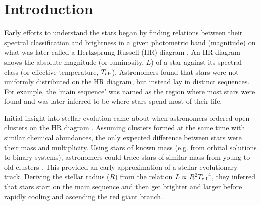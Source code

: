 %
%
%
%
%
\chapter{Introduction}



Early efforts to understand the stars began by finding relations between their spectral classification and brightness in a given photometric band (magnitude) on what was later called a Hertzsprung-Russell (HR) diagram \citep[e.g.][]{Russell1914}. An HR diagram shows the absolute magnitude (or luminosity, \(L\)) of a star against its spectral class (or effective temperature, \({T_\mathrm{eff}}\)). Astronomers found that stars were not uniformly distributed on the HR diagram, but instead lay in distinct sequences. For example, the `main sequence' was named as the region where most stars were found and was later inferred to be where stars spend most of their life.

Initial insight into stellar evolution came about when astronomers ordered open clusters on the HR diagram \needcite. Assuming clusters formed at the same time with similar chemical abundances, the only expected difference between stars were their mass and multiplicity. Using stars of known mass (e.g. from orbital solutions to binary systems), astronomers could trace stars of similar mass from young to old clusters \needcite. This provided an early approximation of a stellar evolutionary track. Deriving the stellar radius (\(R\)) from the relation \(L \propto R^2 {T_\mathrm{eff}}^4\), they inferred that stars start on the main sequence and then get brighter and larger before rapidly cooling and ascending the red giant branch.

